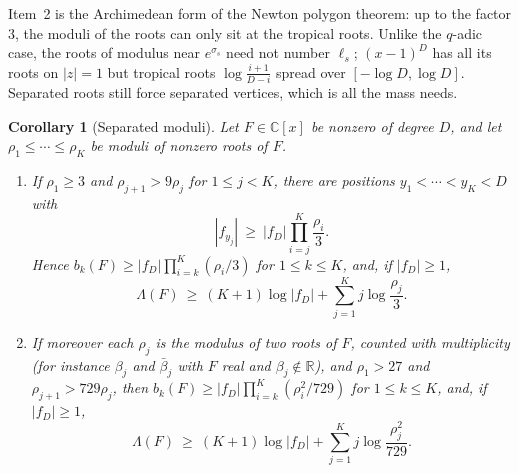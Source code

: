 \documentclass[11pt]{article}
\newtheorem{corollary}[theorem]{Corollary}
\newcommand{\R}{\mathbb R}
\begin{document}
Item~2 is the Archimedean form of the Newton polygon theorem: up to the
factor $3$, the moduli of the roots can only sit at the tropical roots.
Unlike the $q$-adic case, the roots of modulus near $e^{\sigma_s}$ need not
number $\ell_s$; $(x-1)^D$ has all its roots on $|z|=1$ but
tropical roots $\log\frac{i+1}{D-i}$ spread over $[-\log D,\log D]$.
Separated roots still force separated vertices, which is all the mass needs.

\begin{corollary}[Separated moduli]\label{cor:separated}
Let $F\in\mathbb C[x]$ be nonzero of degree $D$, and let
$\rho_1\le\cdots\le\rho_K$ be moduli of nonzero roots of $F$.
\begin{enumerate}
\item If $\rho_1\ge3$ and $\rho_{j+1}>9\rho_j$ for $1\le j<K$, there are
positions $y_1<\cdots<y_K<D$ with
\[
  |f_{y_j}|\ \ge\ |f_D|\prod_{i=j}^K\frac{\rho_i}3 .
\]
Hence $b_k(F)\ge|f_D|\prod_{i=k}^K(\rho_i/3)$ for $1\le k\le K$, and, if
$|f_D|\ge1$,
\[
  \Lambda(F)\ \ge\ (K+1)\log|f_D|+\sum_{j=1}^Kj\log\frac{\rho_j}3 .
\]
\item If moreover each $\rho_j$ is the modulus of two roots of $F$, counted
with multiplicity (for instance $\beta_j$ and $\bar\beta_j$ with $F$ real and
$\beta_j\notin\R$), and $\rho_1>27$ and $\rho_{j+1}>729\rho_j$, then
$b_k(F)\ge|f_D|\prod_{i=k}^K(\rho_i^2/729)$ for $1\le k\le K$, and, if
$|f_D|\ge1$,
\[
  \Lambda(F)\ \ge\ (K+1)\log|f_D|+\sum_{j=1}^Kj\log\frac{\rho_j^2}{729} .
\]
\end{enumerate}
\end{corollary}
\end{document}

